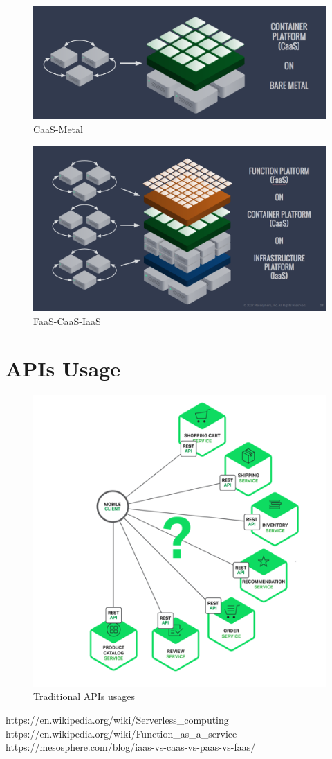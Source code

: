 \documentclass[a4paper,12pt]{article}
\begin{document}
\begin{figure}[H]
\includegraphics[scale=0.361]{figures/CaaS-Metal.png}
\caption{CaaS-Metal}
\end{figure}
\begin{figure}[H]
\includegraphics[scale=0.32]{figures/FaaS-CaaS-IaaS.png}
\caption{FaaS-CaaS-IaaS}
\end{figure}

\section{APIs Usage}
\label{sec:api}
\begin{figure}[H]
\label{fig:api}
\includegraphics[scale=0.7]{figures/api.png}
\caption{Traditional APIs usages}
\end{figure}

\begin{thebibliography}{1}
https://en.wikipedia.org/wiki/Serverless\_computing
https://en.wikipedia.org/wiki/Function\_as\_a\_service
https://mesosphere.com/blog/iaas-vs-caas-vs-paas-vs-faas/

\end{thebibliography}
\end{document}
